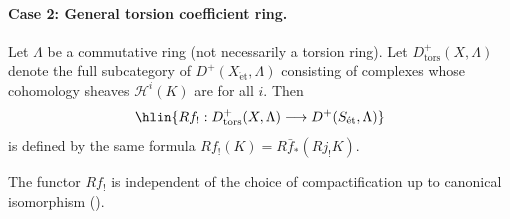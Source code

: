 \begin{definition}
\paragraph*{Case 2: General torsion coefficient ring.}
Let $\Lambda$ be a commutative ring (not necessarily a torsion ring). Let $D^+_{\text{tors}}(X, \Lambda)$ denote the full subcategory of $D^+(X_{\acute{\text{e}}\text{t}}, \Lambda)$ consisting of complexes whose cohomology sheaves $\mathcal{H}^i(K)$ are  for all $i$. Then
$$\hlin{ Rf_! : D^+_{\text{tors}}(X, \Lambda) \longrightarrow D^+(S_{\acute{\text{e}}\text{t}}, \Lambda) }$$
is defined by the same formula $Rf_!(K) = R\bar{f}_*(Rj_! K)$.

The functor $Rf_!$ is independent of the choice of compactification up to canonical isomorphism ().
\end{definition}
